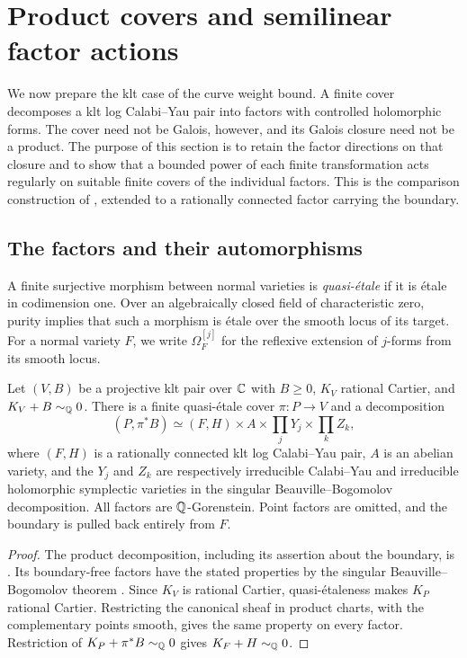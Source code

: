\section{Product covers and semilinear factor actions}\label{sec:blocks}

We now prepare the klt case of the curve weight bound.  A finite
cover decomposes a klt log Calabi--Yau pair into factors with controlled
holomorphic forms.  The cover need not be Galois, however, and its
Galois closure need not be a product.  The purpose of this section is
to retain the factor directions on that closure and to show that a
bounded power of each finite transformation acts regularly on suitable
finite covers of the individual factors.  This is the comparison
construction of \cite[Lemma~3.5]{U}, extended to a rationally connected
factor carrying the boundary.

\subsection{The factors and their automorphisms}

A finite surjective morphism between normal varieties is
\emph{quasi-\'etale} if it is \'etale in codimension one.  Over an
algebraically closed field of characteristic zero, purity implies that
such a morphism is \'etale over the smooth locus of its target.
For a normal variety $F$, we write $\Omega_F^{[j]}$ for the reflexive
extension of $j$-forms from its smooth locus.

\begin{proposition}\label{prop:product-cover}
Let $(V,B)$ be a projective klt pair over $\mathbb C$ with $B\geq0$,
$K_V$ rational Cartier, and $K_V+B\sim_{\mathbb Q}0$.  There is a finite
quasi-\'etale cover $\pi:P\to V$ and a decomposition
\[
 (P,\pi^*B)
 \simeq (F,H)\times A\times\prod_j Y_j\times\prod_k Z_k,
\]
where $(F,H)$ is a rationally connected klt log Calabi--Yau pair,
$A$ is an abelian variety, and the $Y_j$ and $Z_k$ are respectively
irreducible Calabi--Yau and irreducible holomorphic symplectic
varieties in the singular Beauville--Bogomolov decomposition.
All factors are $\mathbb Q$-Gorenstein.  Point factors are omitted, and
the boundary is pulled back entirely from $F$.
\end{proposition}

\begin{proof}
The product decomposition, including its assertion about the boundary,
is \cite[Theorem~1.3]{MW}.  Its boundary-free factors have the stated
properties by the singular Beauville--Bogomolov theorem
\cite[Definition~1.4 and Theorem~1.5]{HP}.  Since $K_V$ is rational
Cartier, quasi-\'etaleness makes $K_P$ rational Cartier.  Restricting
the canonical sheaf in product charts, with the complementary points
smooth, gives the same property on every factor.  Restriction of
$K_P+\pi^*B\sim_{\mathbb Q}0$ gives $K_F+H\sim_{\mathbb Q}0$.
\end{proof}

